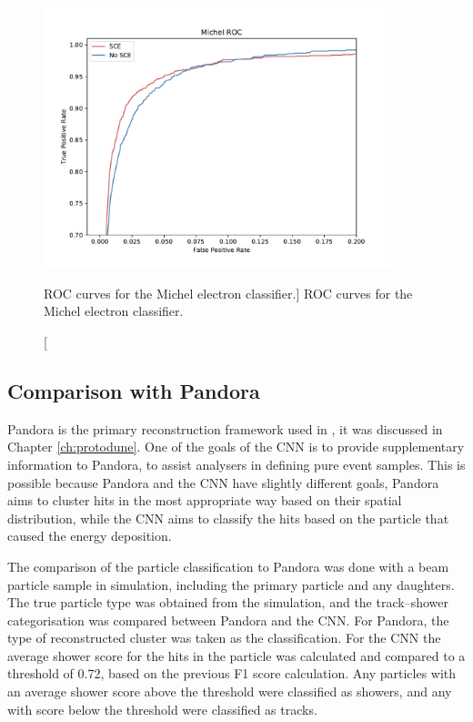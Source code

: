 \begin{figure}
	\centering
	\includegraphics[width=0.9\textwidth]{figures/michel_roc_comparison.pdf}
	\caption
	[ROC curves for the Michel electron classifier.]
	{ROC curves for the Michel electron classifier.}
	\label{fig:michel_roc}
\end{figure}

\subsection{Comparison with Pandora}
Pandora is the primary reconstruction framework used in \protodune{}, it was
discussed in Chapter \ref{ch:protodune}. One of the goals of the CNN is to
provide supplementary information to Pandora, to assist analysers in defining 
pure event samples. This is possible because Pandora and the CNN have slightly
different goals, Pandora aims to cluster hits in the most appropriate way based
on their spatial distribution, while the CNN aims to classify the hits based on 
the particle that caused the energy deposition.

The comparison of the particle classification to Pandora was done with a beam 
particle sample in \protodune{} simulation, including the primary particle and 
any daughters. The true particle type was obtained from the simulation, and 
the track--shower categorisation was compared between Pandora and the CNN. For 
Pandora, the type of reconstructed cluster was taken as the classification. 
For the CNN the average shower score for the hits in the particle was 
calculated and compared to a threshold of 0.72, based on the previous F1 score 
calculation. Any particles with an average shower score above the threshold were
classified as showers, and any with score below the threshold were classified 
as tracks. 

